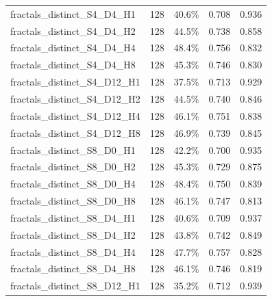 \documentclass[11pt]{article}
\begin{document}
\begin{longtable}{p{}rrrr}
fractals\_\allowbreak{}distinct\_\allowbreak{}S4\_\allowbreak{}D4\_\allowbreak{}H1 & 128 & 40.6\% & 0.708 & 0.936\\
fractals\_\allowbreak{}distinct\_\allowbreak{}S4\_\allowbreak{}D4\_\allowbreak{}H2 & 128 & 44.5\% & 0.738 & 0.858\\
fractals\_\allowbreak{}distinct\_\allowbreak{}S4\_\allowbreak{}D4\_\allowbreak{}H4 & 128 & 48.4\% & 0.756 & 0.832\\
fractals\_\allowbreak{}distinct\_\allowbreak{}S4\_\allowbreak{}D4\_\allowbreak{}H8 & 128 & 45.3\% & 0.746 & 0.830\\
fractals\_\allowbreak{}distinct\_\allowbreak{}S4\_\allowbreak{}D12\_\allowbreak{}H1 & 128 & 37.5\% & 0.713 & 0.929\\
fractals\_\allowbreak{}distinct\_\allowbreak{}S4\_\allowbreak{}D12\_\allowbreak{}H2 & 128 & 44.5\% & 0.740 & 0.846\\
fractals\_\allowbreak{}distinct\_\allowbreak{}S4\_\allowbreak{}D12\_\allowbreak{}H4 & 128 & 46.1\% & 0.751 & 0.838\\
fractals\_\allowbreak{}distinct\_\allowbreak{}S4\_\allowbreak{}D12\_\allowbreak{}H8 & 128 & 46.9\% & 0.739 & 0.845\\
fractals\_\allowbreak{}distinct\_\allowbreak{}S8\_\allowbreak{}D0\_\allowbreak{}H1 & 128 & 42.2\% & 0.700 & 0.935\\
fractals\_\allowbreak{}distinct\_\allowbreak{}S8\_\allowbreak{}D0\_\allowbreak{}H2 & 128 & 45.3\% & 0.729 & 0.875\\
fractals\_\allowbreak{}distinct\_\allowbreak{}S8\_\allowbreak{}D0\_\allowbreak{}H4 & 128 & 48.4\% & 0.750 & 0.839\\
fractals\_\allowbreak{}distinct\_\allowbreak{}S8\_\allowbreak{}D0\_\allowbreak{}H8 & 128 & 46.1\% & 0.747 & 0.813\\
fractals\_\allowbreak{}distinct\_\allowbreak{}S8\_\allowbreak{}D4\_\allowbreak{}H1 & 128 & 40.6\% & 0.709 & 0.937\\
fractals\_\allowbreak{}distinct\_\allowbreak{}S8\_\allowbreak{}D4\_\allowbreak{}H2 & 128 & 43.8\% & 0.742 & 0.849\\
fractals\_\allowbreak{}distinct\_\allowbreak{}S8\_\allowbreak{}D4\_\allowbreak{}H4 & 128 & 47.7\% & 0.757 & 0.828\\
fractals\_\allowbreak{}distinct\_\allowbreak{}S8\_\allowbreak{}D4\_\allowbreak{}H8 & 128 & 46.1\% & 0.746 & 0.819\\
fractals\_\allowbreak{}distinct\_\allowbreak{}S8\_\allowbreak{}D12\_\allowbreak{}H1 & 128 & 35.2\% & 0.712 & 0.939\\

\end{longtable}
\end{document}
